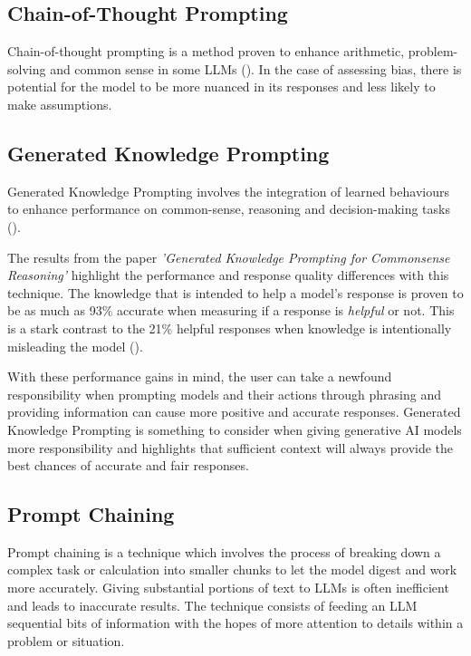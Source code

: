\documentclass[12pt]{article}
\begin{document}
\subsection{Chain-of-Thought Prompting}

Chain-of-thought prompting is a method proven to enhance arithmetic, problem-solving and common sense in some LLMs (\cite{wei-2022}). In the case of assessing bias, there is potential for the model to be more nuanced in its responses and less likely to make assumptions. 

\subsection{Generated Knowledge Prompting}

Generated Knowledge Prompting involves the integration of learned behaviours to enhance performance on common-sense, reasoning and decision-making tasks (\cite{liu-2021}).

The results from the paper \textit{'Generated Knowledge Prompting for Commonsense Reasoning'} highlight the performance and response quality differences with this technique. The knowledge that is intended to help a model's response is proven to be as much as 93\% accurate when measuring if a response is \textit{helpful} or not. This is a stark contrast to the 21\% helpful responses when knowledge is intentionally misleading the model (\cite{liu-2021}).

With these performance gains in mind, the user can take a newfound responsibility when prompting models and their actions through phrasing and providing information can cause more positive and accurate responses. Generated Knowledge Prompting is something to consider when giving generative AI models more responsibility and highlights that sufficient context will always provide the best chances of accurate and fair responses.

\subsection{Prompt Chaining}

Prompt chaining is a technique which involves the process of breaking down a complex task or calculation into smaller chunks to let the model digest and work more accurately. Giving substantial portions of text to LLMs is often inefficient and leads to inaccurate results. The technique consists of feeding an LLM sequential bits of information with the hopes of more attention to details within a problem or situation.
\end{document}
